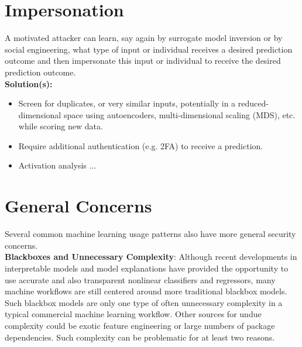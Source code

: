 \documentclass[fleqn]{article}
\begin{document}
\section{Impersonation} \label{sec:impersonation}

A motivated attacker can learn, say again by surrogate model inversion or by social engineering, what type of input or individual receives a desired prediction outcome and then impersonate this input or individual to receive the desired prediction outcome. \\

\noindent\textbf{Solution(s):} 
\begin{itemize}
\item Screen for duplicates, or very similar inputs, potentially in a reduced-dimensional space using autoencoders, multi-dimensional scaling (MDS), etc. while scoring new data.
\item Require additional authentication (e.g. 2FA) to receive a prediction.
\item Activation analysis ...
\end{itemize}

\section{General Concerns}

Several common machine learning usage patterns also have more general security concerns.\\

\noindent\textbf{Blackboxes and Unnecessary Complexity}: Although recent developments in interpretable models and model explanations have provided the opportunity to use accurate and also transparent nonlinear classifiers and regressors, many machine workflows are still centered around more traditional blackbox models. Such blackbox models are only one type of often unnecessary complexity in a typical commercial machine learning workflow. Other sources for undue complexity could be exotic feature engineering or large numbers of package dependencies. Such complexity can be problematic for at least two reasons. 
\end{document}
